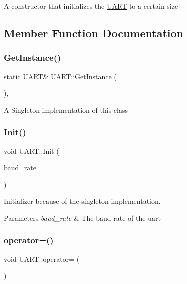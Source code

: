 A constructor that initializes the \hyperlink{class_u_a_r_t}{U\+A\+RT} to a certain size 

\subsection{Member Function Documentation}
\hypertarget{class_u_a_r_t_a745c8f35f3ca3ab6359cedda3e640777}{}\label{class_u_a_r_t_a745c8f35f3ca3ab6359cedda3e640777} 
\subsubsection{\texorpdfstring{Get\+Instance()}{GetInstance()}}
{\footnotesize\ttfamily static \hyperlink{class_u_a_r_t}{U\+A\+RT}\& U\+A\+R\+T\+::\+Get\+Instance (\begin{DoxyParamCaption}{ }\end{DoxyParamCaption})\hspace{0.3cm}{\ttfamily [inline]}, {\ttfamily [static]}}

A Singleton implementation of this class \hypertarget{class_u_a_r_t_aed659ee8bc31ba966144d1a522506a7b}{}\label{class_u_a_r_t_aed659ee8bc31ba966144d1a522506a7b} 
\subsubsection{\texorpdfstring{Init()}{Init()}}
{\footnotesize\ttfamily void U\+A\+R\+T\+::\+Init (\begin{DoxyParamCaption}\item[{uint16\+\_\+t}]{baud\+\_\+rate }\end{DoxyParamCaption})}

Initializer because of the singleton implementation. 
\begin{DoxyParams}{Parameters}
{\em baud\+\_\+rate} & The baud rate of the uart \\
\hline
\end{DoxyParams}
\hypertarget{class_u_a_r_t_a843ab7fc20f5ce5f030d2ca5ee98d6b6}{}\label{class_u_a_r_t_a843ab7fc20f5ce5f030d2ca5ee98d6b6} 
\subsubsection{\texorpdfstring{operator=()}{operator=()}}
{\footnotesize\ttfamily void U\+A\+R\+T\+::operator= (\begin{DoxyParamCaption}\item[{const \hyperlink{class_u_a_r_t}{U\+A\+RT} \&}]{ }\end{DoxyParamCaption})\hspace{0.3cm}{\ttfamily [delete]}}

